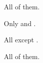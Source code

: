 \begin{solution}
  \begin{sollist}
  \item All of them.
  \item Only  and .
  \item All except .
  \item All of them.




\end{sollist}
\end{solution}

